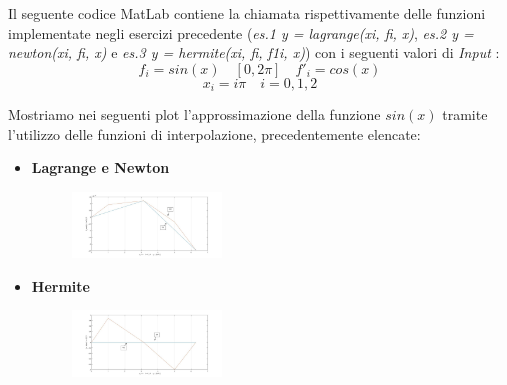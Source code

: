 Il seguente codice MatLab contiene la chiamata rispettivamente delle funzioni implementate negli esercizi precedente (\textit{es.1 y = lagrange(xi, fi, x)}, \textit{es.2 y = newton(xi, fi, x)} e \textit{es.3 y = hermite(xi, fi, f1i, x)}) con i seguenti valori di \textit{Input} : 
	\[
		f_i = sin(x) \quad [0,2\pi] \quad f'_i = cos(x)
	\]
	\[
		x_i = i\pi
		\quad
		i = 0,1,2
	\]

Mostriamo nei seguenti plot l'approssimazione della funzione $sin(x)$ tramite l'utilizzo delle funzioni di interpolazione, precedentemente elencate:
\begin{itemize}
	\item \textbf{Lagrange e Newton}
		\begin{figure}[H]
			\label{Cap4_Es_4}
				\includegraphics[left, width=150px]{Plot/Cap_4_Es_4_Lagrande_Newton}
		\end{figure}
	\item \textbf{Hermite}
		\begin{figure}[H]
			\label{Cap4_Es_4}
				\includegraphics[left, width=150px]{Plot/Cap_4_Es_4_Hermite}
		\end{figure}
\end{itemize}